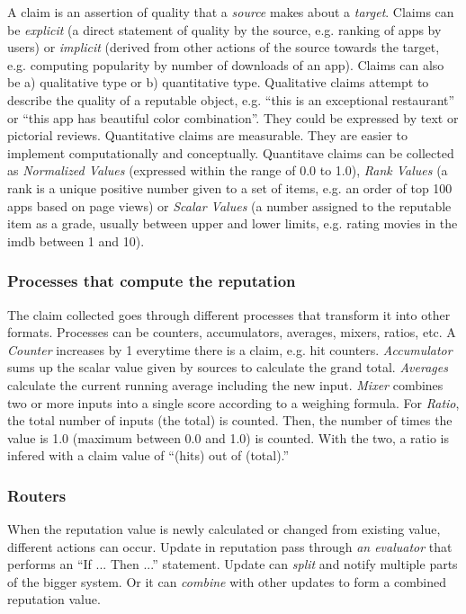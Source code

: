 A claim is an assertion of quality that a \textit{source} makes about a \textit{target}. Claims can be \textit{explicit} (a direct statement of quality by the source, e.g. ranking of apps by users) or \textit{implicit} (derived from other actions of the source towards the target, e.g. computing popularity by number of downloads of an app). Claims can also be a) qualitative type or b) quantitative type. Qualitative claims attempt to describe the quality of a reputable object, e.g. ``this is an exceptional restaurant'' or ``this app has beautiful color combination''. They could be expressed by text or pictorial reviews. Quantitative claims are measurable. They are easier to implement computationally and conceptually. Quantitave claims can be collected as \textit{Normalized Values} (expressed within the range of 0.0 to 1.0), \textit{Rank Values} (a rank is a unique positive number given to a set of items, e.g. an order of top 100 apps based on page views) or \textit{Scalar Values} (a number assigned to the reputable item as a grade, usually between upper and lower limits, e.g. rating movies in the imdb between 1 and 10).

\subsubsection{Processes that compute the reputation}

The claim collected goes through different processes that transform it into other formats. Processes can be counters, accumulators, averages, mixers,  ratios, etc. A \textit{Counter} increases by 1 everytime there is a claim, e.g. hit counters. \textit{Accumulator} sums up the scalar value given by sources to calculate the grand total. \textit{Averages} calculate the current running average including the new input. \textit{Mixer} combines two or more inputs into a single score according to a weighing formula. For \textit{Ratio}, the total number of inputs (the total) is counted. Then, the number of times the value is 1.0 (maximum between 0.0 and 1.0) is counted. With the two, a ratio is infered with a claim value of ``(hits) out of (total).''

\subsubsection{Routers}

When the reputation value is newly calculated or changed from existing value, different actions can occur. Update in reputation pass through \textit{an evaluator} that performs an ``If ... Then ...'' statement. Update can \textit{split} and notify multiple parts of the bigger system. Or it can \textit{combine} with other updates to form a combined reputation value.

